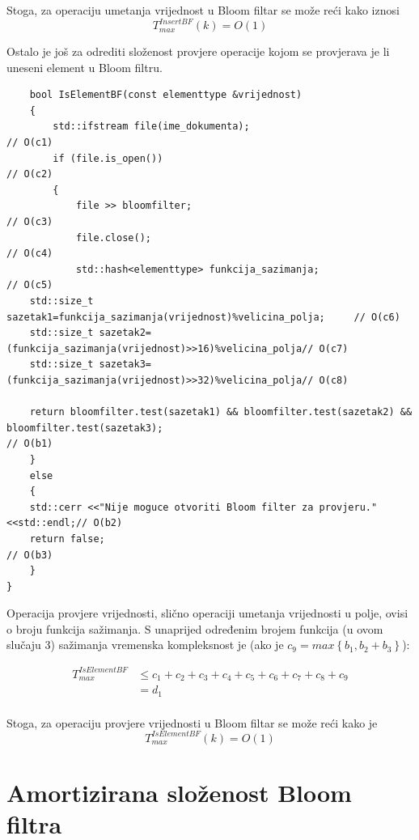 \documentclass{foi}
\begin{document}
Stoga, za operaciju umetanja vrijednost u Bloom filtar se može reći kako iznosi $$ T^{InsertBF}_{max} \left( k \right) = O \left( 1 \right)$$

Ostalo je još za odrediti složenost provjere operacije kojom se provjerava je li uneseni element u Bloom filtru.

\begin{lstlisting}
    bool IsElementBF(const elementtype &vrijednost)
    {
        std::ifstream file(ime_dokumenta);                                  // O(c1)
        if (file.is_open())                                                 // O(c2)
        {
            file >> bloomfilter;                                            // O(c3)
            file.close();                                                   // O(c4)    
            std::hash<elementtype> funkcija_sazimanja;                      // O(c5)
    std::size_t sazetak1=funkcija_sazimanja(vrijednost)%velicina_polja;     // O(c6)
    std::size_t sazetak2=(funkcija_sazimanja(vrijednost)>>16)%velicina_polja// O(c7)
    std::size_t sazetak3=(funkcija_sazimanja(vrijednost)>>32)%velicina_polja// O(c8)
    
    return bloomfilter.test(sazetak1) && bloomfilter.test(sazetak2) && bloomfilter.test(sazetak3);                                                     // O(b1)
    }
    else
    {
    std::cerr <<"Nije moguce otvoriti Bloom filter za provjeru."<<std::endl;// O(b2)
    return false;                                                           // O(b3)
    }
}
\end{lstlisting}

Operacija provjere vrijednosti, slično operaciji umetanja vrijednosti u polje, ovisi o broju funkcija sažimanja. S unaprijed određenim brojem funkcija (u ovom slučaju 3) sažimanja vremenska kompleksnost je (ako je $c_9 =max \left\{ b_1, b_2 + b_3 \right\}$):

\begin{equation*}
    \begin{aligned}
    T^{IsElementBF}_{max} & \leq c_1 + c_2 + c_3 + c_4 + c_5 + c_6 + c_7 + c_8 + c_9\\
    & =  d_1 \\
    \end{aligned}
\end{equation*}

Stoga, za operaciju provjere vrijednosti u Bloom filtar se može reći kako je $$ T^{IsElementBF}_{max} \left( k \right) = O \left( 1 \right)$$

\section{Amortizirana složenost Bloom filtra}
\end{document}
